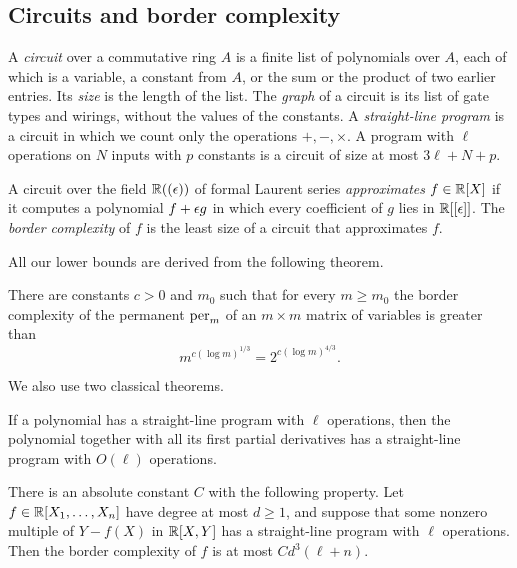\subsection{Circuits and border complexity}

A \emph{circuit} over a commutative ring $A$ is a finite list of polynomials over $A$, each of which is a variable, a constant from $A$, or the sum or the product of two earlier entries. Its \emph{size} is the length of the list. The \emph{graph} of a circuit is its list of gate types and wirings, without the values of the constants. A \emph{straight-line program} is a circuit in which we count only the operations $+,-,\times$. A program with $\ell$ operations on $N$ inputs with $p$ constants is a circuit of size at most $3\ell+N+p$.

\begin{definition}\label{def:border}
A circuit over the field $\mathbb{R}((\epsilon))$ of formal Laurent series \emph{approximates} $f\in\mathbb{R}[X]$ if it computes a polynomial $f+\epsilon g$ in which every coefficient of $g$ lies in $\mathbb{R}[[\epsilon]]$. The \emph{border complexity} of $f$ is the least size of a circuit that approximates $f$.
\end{definition}

All our lower bounds are derived from the following theorem.

\begin{theorem}\label{thm:lowerbound}
There are constants $c>0$ and $m_0$ such that for every $m\ge m_0$ the border complexity of the permanent $\operatorname{per}_m$ of an $m\times m$ matrix of variables is greater than
\[
m^{c(\log m)^{1/3}}=2^{c(\log m)^{4/3}} .
\]
\end{theorem}

We also use two classical theorems.

\begin{theorem}\label{thm:baurstrassen}
If a polynomial has a straight-line program with $\ell$ operations, then the polynomial together with all its first partial derivatives has a straight-line program with $O(\ell)$ operations.
\end{theorem}

\begin{theorem}\label{thm:burgisser}
There is an absolute constant $C$ with the following property. Let $f\in\mathbb{R}[X_1,\dots,X_n]$ have degree at most $d\ge1$, and suppose that some nonzero multiple of $Y-f(X)$ in $\mathbb{R}[X,Y]$ has a straight-line program with $\ell$ operations. Then the border complexity of $f$ is at most $Cd^3(\ell+n)$.
\end{theorem}

